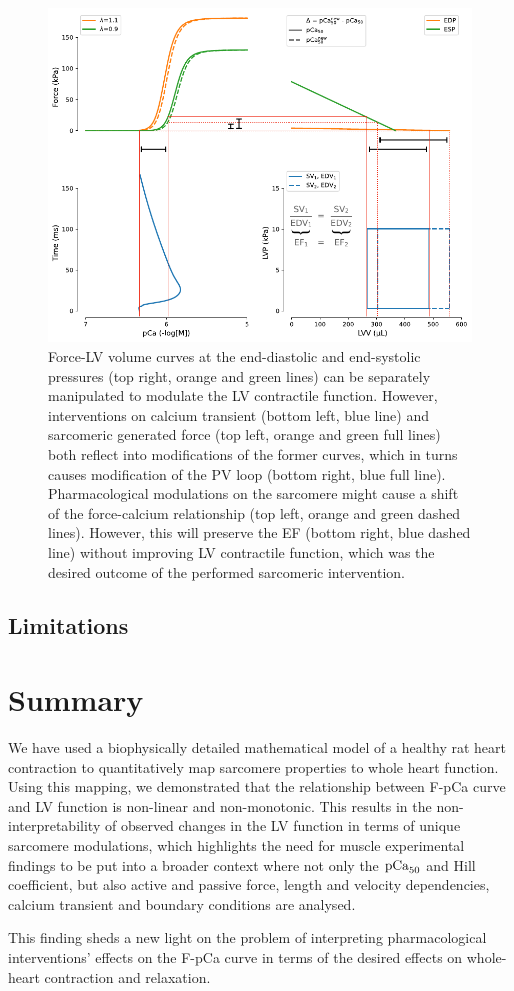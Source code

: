 \begin{figure}[h!]
    \myfloatalign
    \includegraphics[width=\textwidth]{figures/chapter08/Fig7.pdf}
    \caption{Force-LV volume curves at the end-diastolic and end-systolic pressures (top right, orange and green lines) can be separately manipulated to modulate the LV contractile function. However, interventions on calcium transient (bottom left, blue line) and sarcomeric generated force (top left, orange and green full lines) both reflect into modifications of the former curves, which in turns causes modification of the PV loop (bottom right, blue full line). Pharmacological modulations on the sarcomere might cause a shift of the force-calcium relationship (top left, orange and green dashed lines). However, this will preserve the EF (bottom right, blue dashed line) without improving LV contractile function, which was the desired outcome of the performed sarcomeric intervention.}
    \label{fig:schematic}
\end{figure}


%
%
%
\subsection{Limitations}\label{sec:ch8limitations}


%
%
%
\section{Summary}\label{sec:ch8summary}
We have used a biophysically detailed mathematical model of a healthy rat heart contraction to quantitatively map sarcomere properties to whole heart function. Using this mapping, we demonstrated that the relationship between F-pCa curve and LV function is non-linear and non-monotonic. This results in the non-interpretability of observed changes in the LV function in terms of unique sarcomere modulations, which highlights the need for muscle experimental findings to be put into a broader context where not only the $\textrm{pCa}_{50}$ and Hill coefficient, but also active and passive force, length and velocity dependencies, calcium transient and boundary conditions are analysed.

This finding sheds a new light on the problem of interpreting pharmacological interventions' effects on the F-pCa curve in terms of the desired effects on whole-heart contraction and relaxation.